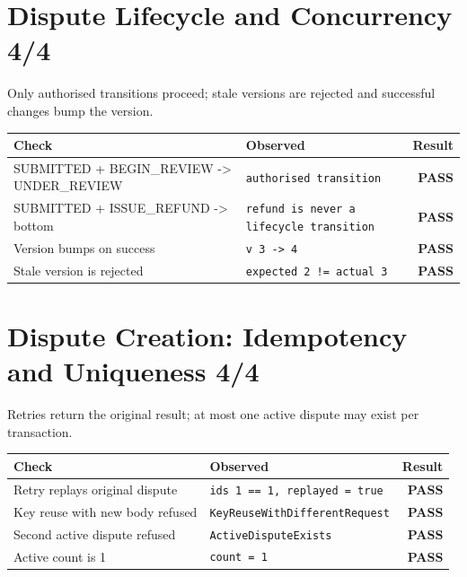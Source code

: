 \documentclass[11pt,a4paper]{article}
\newcommand{\pass}{\textcolor{PassGreen}{\textbf{PASS}}}
\begin{document}
\section*{Dispute Lifecycle and Concurrency \hfill \normalsize\textcolor{ADGBlue}{4/4}}
\noindent Only authorised transitions proceed; stale versions are rejected and successful changes bump the version.\par\vspace{0.4em}
\renewcommand{\arraystretch}{1.25}
\begin{longtable}{@{}p{}p{}r@{}}
\toprule
\textbf{Check} & \textbf{Observed} & \textbf{Result} \\
\midrule
\endhead
SUBMITTED + BEGIN\_REVIEW -\textgreater{} UNDER\_REVIEW & \texttt{\small authorised transition} & \pass \\
SUBMITTED + ISSUE\_REFUND -\textgreater{} bottom & \texttt{\small refund is never a lifecycle transition} & \pass \\
Version bumps on success & \texttt{\small v 3 -\textgreater{} 4} & \pass \\
Stale version is rejected & \texttt{\small expected 2 != actual 3} & \pass \\
\bottomrule
\end{longtable}

\section*{Dispute Creation: Idempotency and Uniqueness \hfill \normalsize\textcolor{ADGBlue}{4/4}}
\noindent Retries return the original result; at most one active dispute may exist per transaction.\par\vspace{0.4em}
\renewcommand{\arraystretch}{1.25}
\begin{longtable}{@{}p{}p{}r@{}}
\toprule
\textbf{Check} & \textbf{Observed} & \textbf{Result} \\
\midrule
\endhead
Retry replays original dispute & \texttt{\small ids 1 == 1, replayed = true} & \pass \\
Key reuse with new body refused & \texttt{\small KeyReuseWithDifferentRequest} & \pass \\
Second active dispute refused & \texttt{\small ActiveDisputeExists} & \pass \\
Active count is 1 & \texttt{\small count = 1} & \pass \\
\bottomrule
\end{longtable}
\end{document}
